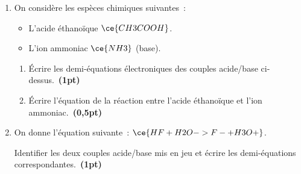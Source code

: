 \begin{enumerate}
    \item On considère les espèces chimiques suivantes~:
          \begin{itemize}
              \item L'acide éthanoïque $\ce{CH3COOH}$.
              \item L'ion ammoniac $\ce{NH3}$ (base).
          \end{itemize}
          \begin{enumerate}
              \item Écrire les demi-équations électroniques des couples
                    acide/base ci-dessus.~\textbf{(1pt)}
              \item Écrire l'équation de la réaction entre l'acide éthanoïque et
                    l'ion ammoniac.~\textbf{(0,5pt)}
          \end{enumerate}
    \item On donne l'équation suivante~:
          $\ce{HF + H2O -> F- + H3O+}$.

          Identifier les deux couples acide/base mis en jeu et écrire les
          demi-équations correspondantes.~\textbf{(1pt)}
\end{enumerate}

